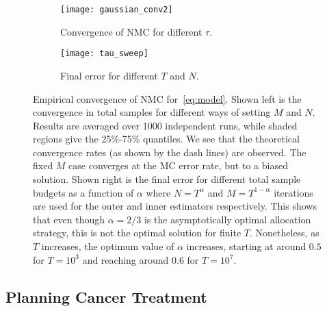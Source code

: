 \begin{figure}[t]
	\centering
	\begin{subfigure}[b]{0.49\textwidth}
		\centering
	\texttt{[image: gaussian\_conv2]}
	\caption{Convergence of NMC for different $\tau$. \label{fig:emprical-conv}}
	\end{subfigure}
	\begin{subfigure}[b]{0.49\textwidth}
		\centering
	\texttt{[image: tau\_sweep]}
		\caption{Final error for different $T$ and $N$.\label{fig:tau_sweep}}
	\end{subfigure}
	\caption{Empirical convergence of NMC for~\eqref{eq:model}.  Shown left is the
		convergence in total samples for different ways of setting $M$ and $N$.  
		Results are averaged over 1000 independent runs, while shaded regions give the 25\%-75\% quantiles. We
		see that the theoretical convergence rates (as shown by the dash lines) are observed. 
		The fixed $M$ case converges at the MC error rate, but to a biased solution.
		Shown right is the final error for different total sample budgets
		as a function of $\alpha$ where $N=T^{\alpha}$ and $M=T^{1-\alpha}$ iterations are used for the outer
		and inner estimators respectively.  This shows that even though $\alpha=2/3$ is the
		asymptotically optimal allocation strategy, this is not the optimal solution for
		finite $T$. Nonetheless, as $T$ increases, the optimum value of $\alpha$ increases,
		starting at around $0.5$ for $T=10^3$ and reaching around $0.6$ for $T=10^7$. \vspace{-5pt}}
\end{figure}	

\subsection{Planning Cancer Treatment}
\label{sec:cancer}

